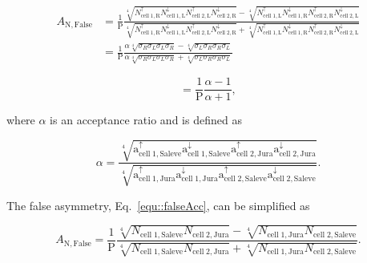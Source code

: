 \begin{equation}
  \label{equ::falseAcc}
  \begin{split}
    A_{\mathrm{N,False}} &= 
    \frac{1}{\mathrm{P}}
    \frac{
      \sqrt[4]{
        N_{\mathrm{cell\;1,R}}^{\uparrow}N_{\mathrm{cell\;1, L}}^{\downarrow}
        N_{\mathrm{cell\;2,L}}^{\uparrow}N_{\mathrm{cell\;2, R}}^{\downarrow}
      } -
      \sqrt[4]{
        N_{\mathrm{cell\;1,L}}^{\uparrow}N_{\mathrm{cell\;1, R}}^{\downarrow}
        N_{\mathrm{cell\;2,R}}^{\uparrow}N_{\mathrm{cell\;2, L}}^{\downarrow}
      }
    }{
      \sqrt[4]{
        N_{\mathrm{cell\;1,R}}^{\uparrow}N_{\mathrm{cell\;1, L}}^{\downarrow}
        N_{\mathrm{cell\;2,L}}^{\uparrow}N_{\mathrm{cell\;2, R}}^{\downarrow}
      } +
      \sqrt[4]{
        N_{\mathrm{cell\;1,L}}^{\uparrow}N_{\mathrm{cell\;1, R}}^{\downarrow}
        N_{\mathrm{cell\;2,R}}^{\uparrow}N_{\mathrm{cell\;2, L}}^{\downarrow}
      }
    }\\
    & =
    \frac{1}{\mathrm{P}}
    \frac{
      \alpha \sqrt[4]{\sigma_{R}\sigma_{L}\sigma_{L}\sigma_{R}} -
      \sqrt[4]{\sigma_{L}\sigma_{R}\sigma_{R}\sigma_{L}}
    }{
      \alpha \sqrt[4]{\sigma_{R}\sigma_{L}\sigma_{L}\sigma_{R}} +
      \sqrt[4]{\sigma_{L}\sigma_{R}\sigma_{R}\sigma_{L}}
    }
  \end{split}
\end{equation}

\begin{equation}
  \label{equ::alphaAsym}
 = \frac{1}{\mathrm{P}}
  \frac{
    \alpha - 1     
  }{
    \alpha + 1
  },
\end{equation}

\noindent
where $\alpha$ is an acceptance ratio and is defined as

\begin{equation} \label{equ::alphaAcc}
  \alpha = \frac{ \sqrt[4]{ \mathrm{a}^{\uparrow}_{\mathrm{cell\;1,Saleve}}
      \mathrm{a}^{\downarrow}_{\mathrm{cell\;1,Saleve}}
      \mathrm{a}^{\uparrow}_{\mathrm{cell\;2,Jura}}
      \mathrm{a}^{\downarrow}_{\mathrm{cell\;2,Jura}}} }{ \sqrt[4]{
      \mathrm{a}^{\uparrow}_{\mathrm{cell\;1,Jura}}
      \mathrm{a}^{\downarrow}_{\mathrm{cell\;1,Jura}}
      \mathrm{a}^{\uparrow}_{\mathrm{cell\;2,Saleve}}
      \mathrm{a}^{\downarrow}_{\mathrm{cell\;2,Saleve}}} }.
\end{equation}

\noindent
The false asymmetry, Eq.~\ref{equ::falseAcc}, can be simplified as

\begin{equation}
  A_{\mathrm{N,False}} = 
  \frac{1}{\mathrm{P}}
  \frac{
    \sqrt[4]{
      N_{\mathrm{cell\;1, Saleve}}
      N_{\mathrm{cell\;2, Jura}}
    } -
    \sqrt[4]{
      N_{\mathrm{cell\;1, Jura}}
      N_{\mathrm{cell\;2, Saleve}}
    }
  }{
    \sqrt[4]{
      N_{\mathrm{cell\;1, Saleve}}
      N_{\mathrm{cell\;2, Jura}}
    } +
    \sqrt[4]{
      N_{\mathrm{cell\;1, Jura}}
      N_{\mathrm{cell\;2, Saleve}}
    }
  }.
\end{equation}

